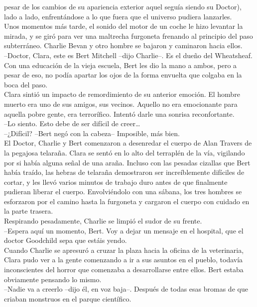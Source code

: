 pesar de los cambios de su apariencia exterior aquel seguía siendo su
Doctor), lado a lado, enfrentándose a lo que fuera que el universo
pudiera lanzarles.\\
Unos momentos más tarde, el sonido del motor de un coche le hizo
levantar la mirada, y se giró para ver una maltrecha furgoneta frenando
al principio del paso subterráneo. Charlie Bevan y otro hombre se
bajaron y caminaron hacia ellos.\\
--Doctor, Clara, este es Bert Mitchell --dijo Charlie--. Es el dueño del
Wheatsheaf.\\
Con una educación de la vieja escuela, Bert les dio la mano a ambos,
pero a pesar de eso, no podía apartar los ojos de la forma envuelta que
colgaba en la boca del paso.\\
Clara sintió un impacto de remordimiento de su anterior emoción. El
hombre muerto era uno de sus amigos, sus vecinos. Aquello no era
emocionante para aquella pobre gente, era terrorífico. Intentó darle una
sonrisa reconfortante.\\
--Lo siento. Esto debe de ser difícil de creer\ldots{}\\
--¿Difícil? --Bert negó con la cabeza-- Imposible, más bien.\\
El Doctor, Charlie y Bert comenzaron a desenredar el cuerpo de Alan
Travers de la pegajosa telaraña. Clara se sentó en lo alto del terraplén
de la vía, vigilando por si había alguna señal de una araña. Incluso con
las pesadas cizallas que Bert había traído, las hebras de telaraña
demostraron ser increíblemente difíciles de cortar, y les llevó varios
minutos de trabajo duro antes de que finalmente pudieran liberar el
cuerpo. Envolviéndolo con una sábana, los tres hombres se esforzaron por
el camino hasta la furgoneta y cargaron el cuerpo con cuidado en la
parte trasera.\\
Respirando pesadamente, Charlie se limpió el sudor de su frente.\\
--Espera aquí un momento, Bert. Voy a dejar un mensaje en el hospital,
que el doctor Goodchild sepa que estáis yendo.\\
Cuando Charlie se apresuró a cruzar la plaza hacia la oficina de la
veterinaria, Clara pudo ver a la gente comenzando a ir a sus asuntos en
el pueblo, todavía inconscientes del horror que comenzaba a
desarrollarse entre ellos. Bert estaba obviamente pensando lo mismo.\\
--Nadie va a creerlo --dijo él, en voz baja--. Después de todas esas
bromas de que criaban monstruos en el parque científico.\\
